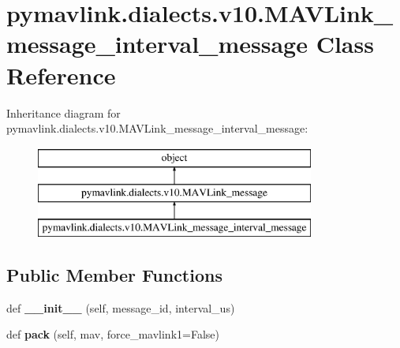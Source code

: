 \hypertarget{classpymavlink_1_1dialects_1_1v10_1_1MAVLink__message__interval__message}{}\section{pymavlink.\+dialects.\+v10.\+M\+A\+V\+Link\+\_\+message\+\_\+interval\+\_\+message Class Reference}
\label{classpymavlink_1_1dialects_1_1v10_1_1MAVLink__message__interval__message}
Inheritance diagram for pymavlink.\+dialects.\+v10.\+M\+A\+V\+Link\+\_\+message\+\_\+interval\+\_\+message\+:\begin{figure}[H]
\begin{center}
\leavevmode
\includegraphics[height=3.000000cm]{classpymavlink_1_1dialects_1_1v10_1_1MAVLink__message__interval__message}
\end{center}
\end{figure}
\subsection*{Public Member Functions}
\begin{DoxyCompactItemize}
\item 
\mbox{\label{classpymavlink_1_1dialects_1_1v10_1_1MAVLink__message__interval__message_ab4e6feb0b226c5ecc8b1fb01d2272784}} 
def {\bfseries \+\_\+\+\_\+init\+\_\+\+\_\+} (self, message\+\_\+id, interval\+\_\+us)
\item 
\mbox{\label{classpymavlink_1_1dialects_1_1v10_1_1MAVLink__message__interval__message_ac095ad4c05f041d8df07ad2131ecbab4}} 
def {\bfseries pack} (self, mav, force\+\_\+mavlink1=False)
\end{DoxyCompactItemize}
